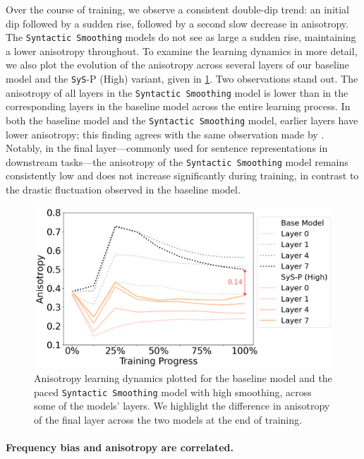 Over the course of training, we observe a consistent double-dip trend: an initial dip followed by a sudden rise, followed by a second slow decrease in anisotropy. The \texttt{Syntactic Smoothing} models do not see as large a sudden rise, maintaining a lower anisotropy throughout. To examine the learning dynamics in more detail, we also plot the evolution of the anisotropy across several layers of our baseline model and the \texttt{SyS}-P (High) variant, given in \cref{fig:anisotropy-layers}. Two observations stand out. The anisotropy of all layers in the \texttt{Syntactic Smoothing} model is lower than in the corresponding layers in the baseline model across the entire learning process. In both the baseline model and the \texttt{Syntactic Smoothing} model, earlier layers have lower anisotropy; this finding agrees with the same observation made by \citeauthor{ethayarajh2019contextual}. Notably, in the final layer—commonly used for sentence representations in downstream tasks—the anisotropy of the \texttt{Syntactic Smoothing} model remains consistently low and does not increase significantly during training, in contrast to the drastic fluctuation observed in the baseline model. 

\begin{figure}[ht!]
    \centering
    \includegraphics[width=\linewidth]{chapters/syntatic-smoothing/figures/anisotropy-layers.png}
    \caption{Anisotropy learning dynamics plotted for the baseline model and the paced \texttt{Syntactic Smoothing} model with high smoothing, across some of the models' layers. We highlight the difference in anisotropy of the final layer across the two models at the end of training.}
    \label{fig:anisotropy-layers}
    \vspace{-1em}
\end{figure}

\paragraph{Frequency bias and anisotropy are correlated.}

